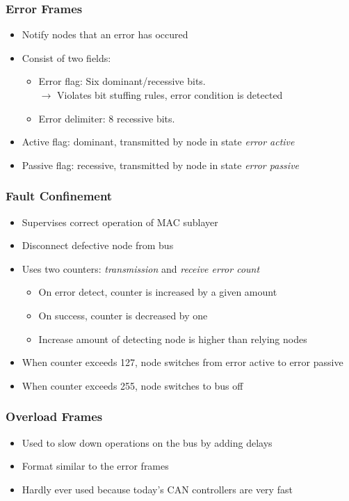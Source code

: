 \documentclass{beamer}
\begin{document}
\begin{frame}
	\frametitle{Error Frames}
	\begin{itemize}
		\item Notify nodes that an error has occured
		\item Consist of two fields:
		\begin{itemize}
			\item Error flag: Six dominant/recessive bits.\\
				$\rightarrow$ Violates bit stuffing rules, error condition is detected
			\item Error delimiter: 8 recessive bits.
		\end{itemize}
		\item Active flag: dominant, transmitted by node in state \emph{error active}
		\item Passive flag: recessive, transmitted by node in state \emph{error passive}
	\end{itemize}
\end{frame}

\begin{frame}
	\frametitle{Fault Confinement}
	\begin{itemize}
		\item Supervises correct operation of MAC sublayer
		\item Disconnect defective node from bus
		\item Uses two counters: \emph{transmission} and \emph{receive error count}
		\begin{itemize}
			\item On error detect, counter is increased by a given amount
			\item On success, counter is decreased by one
			\item Increase amount of detecting node is higher than relying nodes
		\end{itemize}
		\item When counter exceeds 127, node switches from error active to error passive
		\item When counter exceeds 255, node switches to bus off
	\end{itemize}
\end{frame}

\begin{frame}
	\frametitle{Overload Frames}
	\begin{itemize}
		\item Used to slow down operations on the bus by adding delays
		\item Format similar to the error frames
		\item Hardly ever used because today's CAN controllers are very fast
	\end{itemize}
\end{frame}
\end{document}
